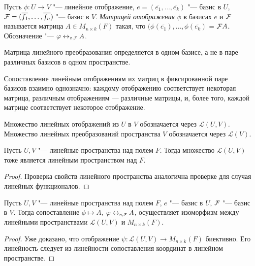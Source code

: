 \begin{definition}
	Пусть $\phi: U \rightarrow V$ "--- линейное отображение, $e = (\overline{e_1}, \dots, \overline{e_k})$ "--- базис в $U$, $\FF  = (\overline{f_1}, \dots, \overline{f_n})$ "--- базис в $V$. \textit{Матрицей отображения} $\phi$ в базисах $e$ и $\FF $ называется матрица $A \in M_{n \times k}(F)$ такая, что $(\phi(\overline{e_1}), \dotsc, \phi(\overline{e_k})$ = $\FF A$. Обозначение "--- $\phi \leftrightarrow_{e, \FFF} A$.
\end{definition}

\begin{note}
	Матрица линейного преобразования определяется в одном базисе, а не в паре различных базисов в одном пространстве.
\end{note}

\begin{note}
	Сопоставление линейным отображениям их матриц в фиксированной паре базисов взаимно однозначно: каждому отображению соответствует некоторая матрица, различным отображениям --- различные матрицы, и, более того, каждой матрице соответствует некоторое отображение.
\end{note}

\begin{definition}
	Множество линейных отображений из $U$ в $V$ обозначается через $\mathcal{L}(U, V)$. Множество линейных преобразований пространства $V$ обозначается через $\mathcal{L}(V)$.
\end{definition}

\begin{proposition}
	Пусть $U, V$ "--- линейные пространства над полем $F$. Тогда множество $\mathcal{L}(U, V)$ тоже является линейным пространством над $F$.
\end{proposition}

\begin{proof}
	Проверка свойств линейного пространства аналогична проверке для случая линейных функционалов.
\end{proof}

\begin{proposition}
		Пусть $U, V$ "--- линейные пространства над полем $F$, $e$ "--- базис в $U$, $\FF$ "--- базис в $V$. Тогда сопоставление $\phi \mapsto A$, $\phi \leftrightarrow_{e, \FFF} A$, осуществляет изоморфизм между линейными пространствами $\mathcal{L}(U, V)$ и $M_{n\times k}(F)$.
\end{proposition}

\begin{proof}
	Уже доказано, что отображение $\psi : \mathcal{L}(U, V) \rightarrow M_{n\times k}(F)$ биективно. Его линейность следует из линейности сопоставления координат в линейном пространстве.
\end{proof}

